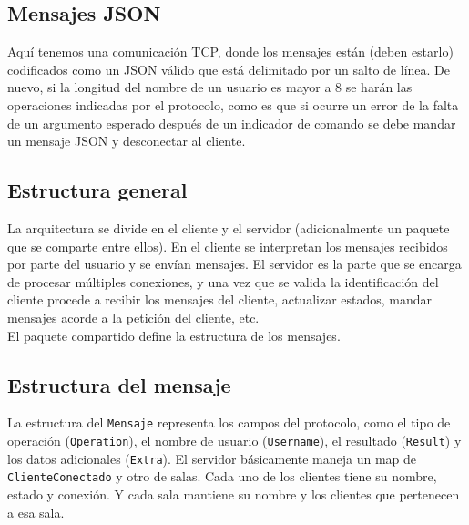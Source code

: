 \documentclass[12pt,a4paper]{article}
\begin{document}
\subsection*{Mensajes JSON}
Aquí tenemos una comunicación TCP, donde los mensajes están (deben estarlo)
codificados como un JSON válido que está delimitado por un salto de línea.
De nuevo, si la longitud del nombre de un usuario es mayor a 8 se harán las
operaciones indicadas por el protocolo, como es que si ocurre un error de
la falta de un argumento esperado después de un indicador de comando se debe
mandar un mensaje JSON y desconectar al cliente.

\subsection*{Estructura general}
La arquitectura se divide en el cliente y el servidor (adicionalmente
un paquete que se comparte entre ellos). En el cliente se interpretan los
mensajes recibidos por parte del usuario y se envían mensajes. El servidor es
la parte que se encarga de procesar múltiples conexiones, y una vez que se
valida la identificación del cliente procede a recibir los mensajes del cliente,
actualizar estados, mandar mensajes acorde a la petición del cliente, etc.\\
El paquete compartido define la estructura de los mensajes.

\begin{center}
\end{center}

\newpage

\subsection*{Estructura del mensaje}
La estructura del \texttt{Mensaje} representa los campos del protocolo, como el
tipo de operación (\texttt{Operation}), el nombre de usuario (\texttt{Username}), el resultado (\texttt{Result}) y los datos adicionales (\texttt{Extra}).
El servidor básicamente maneja un map de \texttt{ClienteConectado} y otro de salas.
Cada uno de los clientes tiene su nombre, estado y conexión. Y cada sala mantiene su
nombre y los clientes que pertenecen a esa sala.
\end{document}
